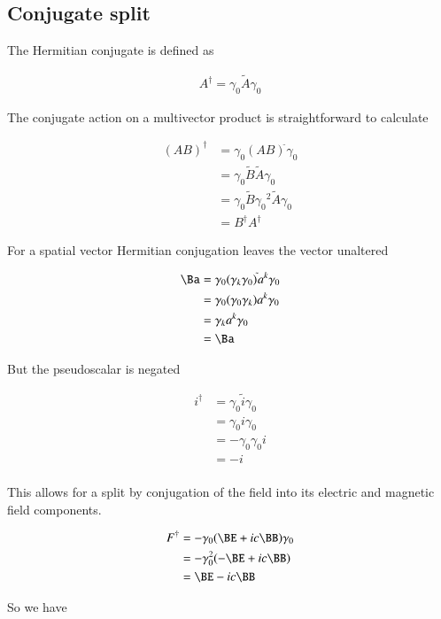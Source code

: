 \subsection{Conjugate split}

The Hermitian conjugate is defined as

\begin{align}
A^\dagger = \gamma_0 \tilde{A} \gamma_0
\end{align}

The conjugate action on a multivector product is straightforward to calculate

\begin{align*}
(A B)^\dagger
&= \gamma_0 (A B)^{\tilde{}} \gamma_0 \\
&= \gamma_0 \tilde{B} \tilde{A} \gamma_0 \\
&= \gamma_0 \tilde{B} {\gamma_0}^2 \tilde{A} \gamma_0 \\
&= B^\dagger A^\dagger
\end{align*}

For a spatial vector Hermitian conjugation leaves the vector unaltered

\begin{align*}
\Ba
&= \gamma_0 (\gamma_k \gamma_0)^{\tilde{}} a^k \gamma_0 \\
&= \gamma_0 (\gamma_0 \gamma_k) a^k \gamma_0 \\
&= \gamma_k a^k \gamma_0 \\
&= \Ba
\end{align*}

But the pseudoscalar is negated

\begin{align*}
i^\dagger
&=
\gamma_0 \tilde{i} \gamma_0 \\
&=
\gamma_0 i \gamma_0 \\
&=
-\gamma_0 \gamma_0 i \\
&=
- i \\
\end{align*}

This allows for a split by conjugation of the field into its electric and magnetic field components.

\begin{align*}
F^\dagger
&= -\gamma_0 ( \BE + i c \BB) \gamma_0 \\
&= -\gamma_0^2 ( -\BE + i c \BB) \\
&= \BE - i c\BB \\
\end{align*}

So we have

